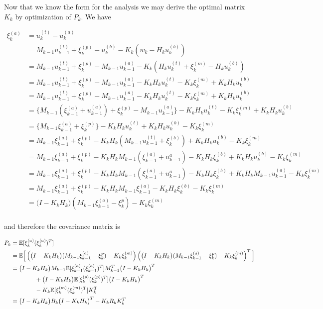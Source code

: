 Now that we know the form for the analysis we may derive the optimal matrix $K_k$ by optimization of $P_k$. We have

\begin{align}
	\xi_k^{(a)} &= u_k^{(t)} - u_k^{(a)} \\
                &= M_{k-1}u_{k-1}^{(t)} + \xi_{k}^{(p)} - u_k^{(b)} - K_k\left(w_k - H_ku_k^{(b)} \right) \\
                &= M_{k-1}u_{k-1}^{(t)} + \xi_{k}^{(p)} - M_{k-1}u_{k-1}^{(a)} - K_k\left(H_ku_k^{(t)} + \xi_k^{(m)} - H_ku_k^{(b)} \right) \\
                &= M_{k-1}u_{k-1}^{(t)} + \xi_{k}^{(p)} - M_{k-1}u_{k-1}^{(a)} - K_kH_ku_k^{(t)} - K_k\xi_k^{(m)} + K_kH_ku_k^{(b)} \\
                &= M_{k-1}u_{k-1}^{(t)} + \xi_{k}^{(p)} - M_{k-1}u_{k-1}^{(a)} - K_kH_ku_k^{(t)} - K_k\xi_k^{(m)} + K_kH_ku_k^{(b)} \\
                &= \Big\{ M_{k-1}(\xi_{k-1}^{(a)}+u_{k-1}^{(a)}) + \xi_{k}^{(p)} - M_{k-1}u_{k-1}^{(a)} \Big\} - K_kH_ku_k^{(t)} - K_k\xi_k^{(m)} + K_kH_ku_k^{(b)} \\
                &= \Big\{ M_{k-1}\xi_{k-1}^{(a)} + \xi_{k}^{(p)} \Big\} - K_kH_ku_k^{(t)} + K_kH_ku_k^{(b)} - K_k\xi_k^{(m)}\\
                &= M_{k-1}\xi_{k-1}^{(a)} + \xi_{k}^{(p)} - K_kH_k(M_{k-1}u_{k-1}^{(t)} + \xi_k^{(b)}) + K_kH_ku_k^{(b)} - K_k\xi_k^{(m)}\\
                &= M_{k-1}\xi_{k-1}^{(a)} + \xi_{k}^{(p)} - K_kH_kM_{k-1}(\xi_{k-1}^{(a)} + u_{k-1}^a) - K_kH_k\xi_k^{(b)} + K_kH_ku_k^{(b)} - K_k\xi_k^{(m)}\\
                &= M_{k-1}\xi_{k-1}^{(a)} + \xi_{k}^{(p)} - K_kH_kM_{k-1}(\xi_{k-1}^{(a)} + u_{k-1}^a) - K_kH_k\xi_k^{(b)} + K_kH_kM_{k-1}u_{k-1}^{(a)} - K_k\xi_k^{(m)}\\
                &= M_{k-1}\xi_{k-1}^{(a)} + \xi_{k}^{(p)} - K_kH_kM_{k-1}\xi_{k-1}^{(a)} - K_kH_k\xi_k^{(b)} - K_k\xi_k^{(m)}\\
                &= \big(I-K_kH_k \big)(M_{k-1}\xi_{k-1}^{(a)} - \xi_{k}^p) - K_k\xi_k^{(m)}\\
\end{align}

and therefore the covariance matrix is

\begin{align}
    P_k &= \mathbb{E}[\xi_{k}^{(a)}(\xi_{k}^{(a)})^T] \\
        &= \mathbb{E}\Big[\left(\big(I-K_kH_k \big)(M_{k-1}\xi_{k-1}^{(a)} - \xi_{k}^p) - K_k\xi_k^{(m)} \right) \left(\big(I-K_kH_k \big)(M_{k-1}\xi_{k-1}^{(a)} - \xi_{k}^p) - K_k\xi_k^{(m)} \right)^T \Big] \\
        &= \big(I-K_kH_k \big)M_{k-1}\mathbb{E}[\xi_{k-1}^{(a)}(\xi_{k-1}^{(a)})^T]M_{k-1}^T\big(I-K_kH_k \big)^T \\
        &\qquad \qquad + \big(I-K_kH_k \big)\mathbb{E}[\xi_k^{(p)}(\xi_k^{(p)})^T]\big(I-K_kH_k \big)^T \notag\\
        & \qquad \qquad - K_k\mathbb{E}[\xi_{k}^{(m)}(\xi_k^{(m)})^T]K_k^T \notag\\
        &= \big(I-K_kH_k \big)B_k\big(I-K_kH_k \big)^T - K_kR_kK_k^T
\end{align}

